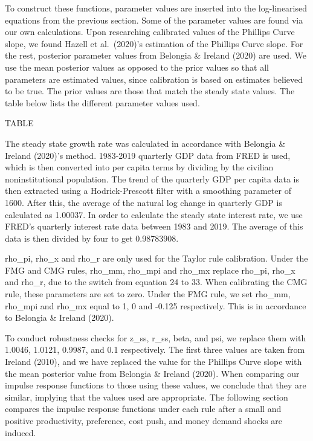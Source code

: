 \documentclass[11pt,preprint, authoryear]{elsarticle}
\numberwithin{equation}{section}
\numberwithin{figure}{section}
\numberwithin{table}{section}
\begin{document}
To construct these functions, parameter values are inserted into the
log-linearised equations from the previous section. Some of the
parameter values are found via our own calculations. Upon researching
calibrated values of the Phillips Curve slope, we found Hazell et
al.~(2020)'s estimation of the Phillips Curve slope. For the rest,
posterior parameter values from Belongia \& Ireland (2020) are used. We
use the mean posterior values as opposed to the prior values so that all
parameters are estimated values, since calibration is based on estimates
believed to be true. The prior values are those that match the steady
state values. The table below lists the different parameter values used.

TABLE

The steady state growth rate was calculated in accordance with Belongia
\& Ireland (2020)'s method. 1983-2019 quarterly GDP data from FRED is
used, which is then converted into per capita terms by dividing by the
civilian noninstitutional population. The trend of the quarterly GDP per
capita data is then extracted using a Hodrick-Prescott filter with a
smoothing parameter of 1600. After this, the average of the natural log
change in quarterly GDP is calculated as 1.00037. In order to calculate
the steady state interest rate, we use FRED's quarterly interest rate
data between 1983 and 2019. The average of this data is then divided by
four to get 0.98783908.

rho\_pi, rho\_x and rho\_r are only used for the Taylor rule
calibration. Under the FMG and CMG rules, rho\_mm, rho\_mpi and rho\_mx
replace rho\_pi, rho\_x and rho\_r, due to the switch from equation 24
to 33. When calibrating the CMG rule, these parameters are set to zero.
Under the FMG rule, we set rho\_mm, rho\_mpi and rho\_mx equal to 1, 0
and -0.125 respectively. This is in accordance to Belongia \& Ireland
(2020).

To conduct robustness checks for z\_ss, r\_ss, beta, and psi, we replace
them with 1.0046, 1.0121, 0.9987, and 0.1 respectively. The first three
values are taken from Ireland (2010), and we have replaced the value for
the Phillips Curve slope with the mean posterior value from Belongia \&
Ireland (2020). When comparing our impulse response functions to those
using these values, we conclude that they are similar, implying that the
values used are appropriate. The following section compares the impulse
response functions under each rule after a small and positive
productivity, preference, cost push, and money demand shocks are
induced.
\end{document}
